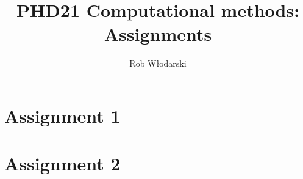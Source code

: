 \documentclass[11pt]{article}
\numberwithin{equation}{section}
\begin{document}
\title{\Large \bfseries \vspace{-5mm} PHD21 Computational methods: Assignments \vspace{-5mm}}
\author{Rob Włodarski}
\date{}
\maketitle

\tableofcontents
\newpage


\section{Assignment 1}


\section{Assignment 2}

%
%
%


%
%
%


\printbibliography
\end{document}
